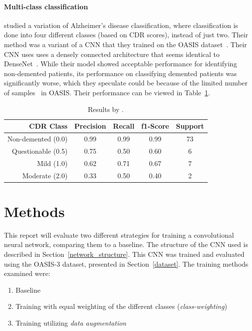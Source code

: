 \documentclass{kththesis}
\begin{document}
\subsubsection{Multi-class classification}
\textcite{islam2018early} studied a variation of Alzheimer's disease classification, where classification is done into four different classes (based on CDR scores), instead of just two. Their method was a variant of a CNN that they trained on the OASIS dataset~\cite{oasis}. Their CNN uses uses a densely connected architecture that seems identical to DenseNet~\cite{huang2017densely}. While their model showed acceptable performance for identifying non-demented patients, its performance on classifying demented patients was significantly worse, which they speculate could be because of the limited number of samples~\cite{islam2018early} in OASIS\@. Their performance can be viewed in Table~\ref{tab:results_islam_zhang}.

\begin{table}[H]
  \begin{center}
    \caption{Results by \textcite{islam2018early}. \label{tab:results_islam_zhang}}
    \begin{tabular}{r|ccc|c}
      \textbf{CDR Class} & \textbf{Precision} & \textbf{Recall} & \textbf{f1-Score} & \textbf{Support} \\
      \toprule
      Non-demented (0.0) & 0.99 & 0.99 & 0.99 & 73 \\
      Questionable (0.5) & 0.75 & 0.50 & 0.60 & 6  \\
      Mild (1.0)         & 0.62 & 0.71 & 0.67 & 7  \\
      Moderate (2.0)     & 0.33 & 0.50 & 0.40 & 2   \\
    \end{tabular}
  \end{center}
\end{table}

\chapter{Methods} \label{methods}
This report will evaluate two different strategies for training a convolutional neural network, comparing them to a baseline. The structure of the CNN used is described in Section~\ref{network_structure}. This CNN was trained and evaluated using the OASIS-3 dataset, presented in Section~\ref{dataset}. The training methods examined were:
\begin{enumerate}
  \item Baseline
  \item Training with equal weighting of the different classes (\textit{class-weighting})
  \item Training utilizing \textit{data augmentation}
\end{enumerate}
\end{document}
